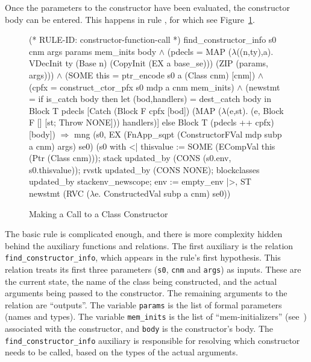 \documentclass[11pt]{article}
\begin{document}
Once the parameters to the constructor have been evaluated, the
constructor body can be entered.%
%
This happens in rule , for which see
Figure~\ref{fig:constructor-function-call}.
\begin{figure}[htbp]
\begin{stdrule}
(* RULE-ID: constructor-function-call *)
     find_constructor_info s0 cnm args params mem_inits body \(\land\)
     (pdecls = MAP (\(\lambda\)((n,ty),a).
                        VDecInit ty (Base n)
                                    (CopyInit (EX a base_se)))
                   (ZIP (params, args))) \(\land\)
     (SOME this = ptr_encode s0 a (Class cnm) [cnm]) \(\land\)
     (cpfx = construct_ctor_pfx s0 mdp a cnm mem_inits) \(\land\)
     (newstmt =
        if is_catch body then
          let (bod,handlers) = dest_catch body
          in
            Block T pdecls
              [Catch (Block F cpfx [bod])
                     (MAP (\(\lambda\)(e,st).
                             (e, Block F [] [st; Throw NONE]))
                          handlers)]
        else Block T (pdecls ++ cpfx) [body])
   \(\Rightarrow\)
     mng (s0, EX (FnApp_sqpt (ConstructorFVal mdp subp a cnm)
                             args) se0)
         (s0 with <| thisvalue :=
                       SOME (ECompVal this (Ptr (Class cnm)));
                     stack updated_by
                       (CONS (s0.env, s0.thisvalue));
                     rvstk updated_by (CONS NONE);
                     blockclasses updated_by stackenv_newscope;
                     env := empty_env |>,
          ST newstmt (RVC (\(\lambda\)e. ConstructedVal subp a cnm)
                          se0))
\end{stdrule}
\caption{Making a Call to a Class Constructor}
\label{fig:constructor-function-call}
\end{figure}
The basic rule is complicated enough, and there is more complexity
hidden behind the auxiliary functions and relations.  The first
auxiliary is the relation \texttt{find_constructor_info}, which
appears in the rule's first hypothesis.  This relation treats its
first three parameters (\texttt{s0}, \texttt{cnm} and \texttt{args})
as inputs.  These are the current state, the name of the class being
constructed, and the actual arguments being passed to the constructor.
The remaining arguments to the relation are ``outputs''.  The variable
\texttt{params} is the list of formal parameters (names and types).
The variable \texttt{mem_inits} is the list of ``mem-initializers''
(see~\cite[\S12.6.2]{cpp-standard-iso14882}) associated with the
constructor, and \texttt{body} is the constructor's body.  The
\texttt{find_constructor_info} auxiliary is responsible for resolving
which constructor needs to be called, based on the types of the actual
arguments.
\end{document}
